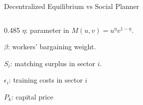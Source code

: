 \documentclass[9pt,xcolor={svgnames}]{beamer}
\begin{document}
\begin{frame}{Decentralized Equilibrium vs Social Planner}
\begin{columns}[T,onlytextwidth]
\begin{column}{0.485\textwidth}
\vspace{8mm}
 $\eta$: parameter in  $M(u,v)=u^\eta v^{1-\eta}$.

$\beta$: workers' bargaining weight.

 $S_i$: matching surplus in sector $i$.

 $\epsilon_i$: training costs in sector $i$

 $P_k$: capital price
 
\end{column}
\end{columns}

\vspace{5em}




\end{frame}

















\end{document}

